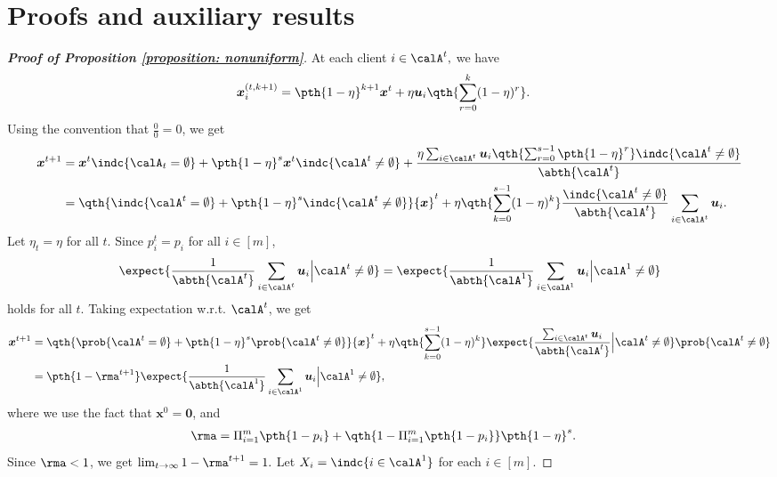 \documentclass[letterpaper, 10 pt, conference]{ieeeconf}  %
\newcommand{\x}{{\bm x}}
\newcommand{\bu}{{\bm u}}
\begin{document}



\onecolumn

\appendix
\
\section{Proofs and auxiliary results}
\label{sec: proofs}



\begin{proof}[\bf Proof of Proposition \ref{proposition: nonuniform}]
At each client $i\in\calA^t,$ we have
\begin{align*}
\x_i^{(t,k+1)} 
& = \pth{1-\eta}^{k+1} \x^t + \eta \bu_i \qth{\sum_{r=0}^k (1-\eta)^r}. 
\end{align*}
Using the convention that $\frac{0}{0}=0$, we get 
\begin{align*}
\x^{t+1}
& = \x^t\indc{\calA_t=\emptyset} 
+ \pth{1 - \eta}^{s}\x^t\indc{\calA^t\neq \emptyset} %
+ \frac{\eta \sum_{i\in\calA^t}\bu_i \qth{\sum_{r=0}^{s-1} \pth{1-\eta}^r}\indc{\calA^t\neq\emptyset}}{\abth{\calA^t}}\\
& = \qth{\indc{\calA^t = \emptyset}+\pth{1-\eta}^{s} \indc{\calA^t \neq \emptyset}}\x^t %
+ \eta \qth{\sum_{k=0}^{s-1} (1-\eta)^k} \frac{\indc{\calA^t \neq \emptyset}}{\abth{\calA^t}}\sum_{i\in \calA^t}\bu_i. 
\end{align*}
Let $\eta_t = \eta$ for all $t$. 
Since $p_i^t=p_i$ for all $i\in [m]$, 
\[
\expect{\frac{1}{\abth{\calA^t}}\sum_{i\in \calA^t}\bu_i \Big| \calA^t \neq \emptyset} = \expect{\frac{1}{\abth{\calA^1}}\sum_{i\in \calA^1}\bu_i \Big| \calA^1 \neq \emptyset} 
\]
holds for all $t$. 
Taking expectation w.r.t. $\calA^t$, we get 
\begin{align*}
\x^{t+1}  &= \qth{\prob{\calA^t = \emptyset}+\pth{1-\eta}^{s} \prob{\calA^t \neq \emptyset}} \x^t  %
+ \eta \qth{\sum_{k=0}^{s-1} (1-\eta)^k} \expect{\frac{\sum_{i\in \calA^t}\bu_i}{\abth{\calA^t}}\Big| \calA^t \neq \emptyset} \prob{\calA^t \neq \emptyset}\\
& = \pth{1 - {\rma}^{t+1}} \expect{\frac{1}{\abth{\calA^1}}\sum_{i\in \calA^1}\bu_i \Big| \calA^1 \neq \emptyset}, 
\end{align*}
where we use the fact that $\x^0=\bm{0}$, and 
\begin{align*}
\rma& = \Pi_{i=1}^m\pth{1-p_i} + \qth{1 -\Pi_{i=1}^m\pth{1-p_i}}\pth{1-\eta}^s. 
\end{align*}
Since $\rma<1$, we get 
$
\lim_{t\rightarrow\infty} 1 - \rma^{t+1} = 1. 
$
Let $X_i = \indc{i\in \calA^1}$ for each $i\in [m]$. 

\end{proof}
\end{document}
